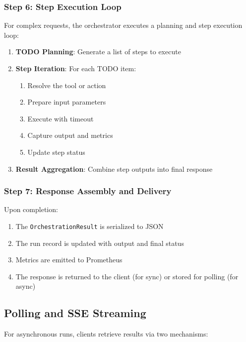 \subsubsection{Step 6: Step Execution Loop}

For complex requests, the orchestrator executes a planning and step execution loop:

\begin{enumerate}
    \item \textbf{TODO Planning}: Generate a list of steps to execute
    \item \textbf{Step Iteration}: For each TODO item:
    \begin{enumerate}
        \item Resolve the tool or action
        \item Prepare input parameters
        \item Execute with timeout
        \item Capture output and metrics
        \item Update step status
    \end{enumerate}
    \item \textbf{Result Aggregation}: Combine step outputs into final response
\end{enumerate}

\subsubsection{Step 7: Response Assembly and Delivery}

Upon completion:

\begin{enumerate}
    \item The \texttt{OrchestrationResult} is serialized to JSON
    \item The run record is updated with output and final status
    \item Metrics are emitted to Prometheus
    \item The response is returned to the client (for sync) or stored for polling (for async)
\end{enumerate}

\subsection{Polling and SSE Streaming}

For asynchronous runs, clients retrieve results via two mechanisms:

